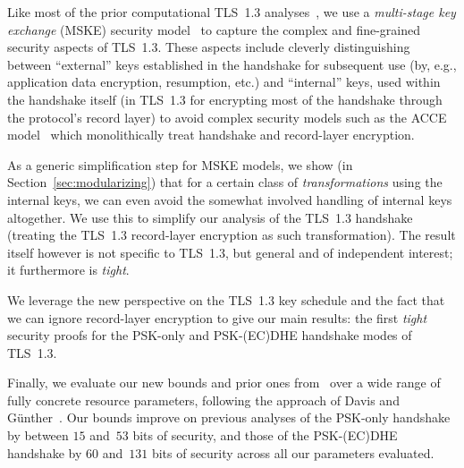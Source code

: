 	
	Like most of the prior computational TLS~1.3 analyses~\cite{CCS:DFGS15,EuroSP:FisGue17,JC:DFGS21,JC:DieJag21},
	we use a \emph{multi-stage key exchange} (MSKE) security model~\cite{CCS:FisGue14} to capture the complex and fine-grained security aspects of TLS~1.3.
	These aspects include cleverly distinguishing between ``external'' keys established in the handshake for subsequent use (by, e.g., application data encryption, resumption, etc.)
	and ``internal'' keys, used within the handshake itself (in TLS~1.3 for encrypting most of the handshake through the protocol's record layer)
	to avoid complex security models such as the ACCE model~\cite{C:JKSS12} which monolithically treat handshake and record-layer encryption.
	
	As a generic simplification step for MSKE models, we show (in Section~\ref{sec:modularizing}) that for a certain class of \emph{transformations} using the internal keys,
	we can even avoid the somewhat involved handling of internal keys altogether.
	We use this to simplify our analysis of the TLS~1.3 handshake (treating the TLS~1.3 record-layer encryption as such transformation).
	The result itself however is not specific to TLS~1.3, but general and of independent interest; it furthermore is \emph{tight}.
	
	
	We leverage the new perspective on the TLS~1.3 key schedule and the fact that we can ignore record-layer encryption
	to give our main results: the first \emph{tight} security proofs for the PSK-only and PSK-(EC)DHE handshake modes of TLS~1.3.
	
	
	Finally, we evaluate our new bounds and prior ones from~\cite{JC:DFGS21} over a wide range of fully concrete resource parameters, following the approach of Davis and Günther~\cite{ACNS:DavGun21}.
	Our bounds improve on previous analyses of the PSK-only handshake by between $15$ and~$53$ bits of security, and those of the PSK-(EC)DHE handshake by $60$ and~$131$ bits of security across all our parameters evaluated.

